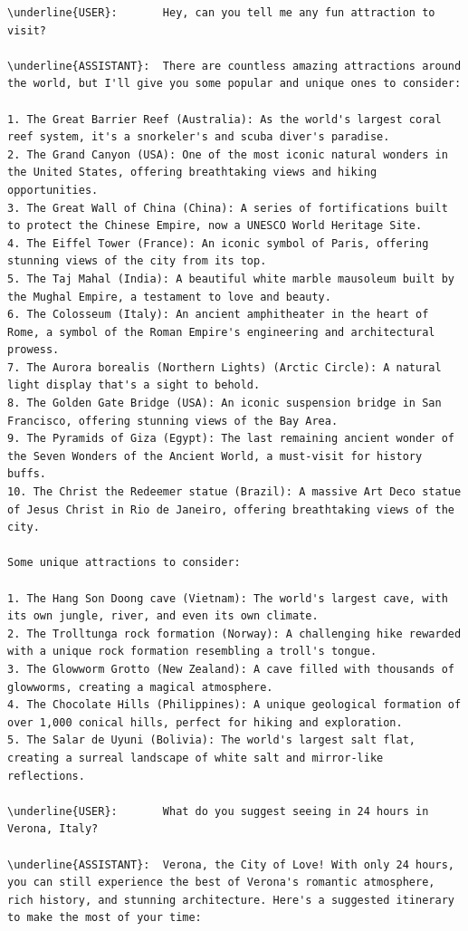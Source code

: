 \begin{Verbatim}[breaklines=true]
\underline{USER}:       Hey, can you tell me any fun attraction to visit?

\underline{ASSISTANT}:  There are countless amazing attractions around the world, but I'll give you some popular and unique ones to consider:

1. The Great Barrier Reef (Australia): As the world's largest coral reef system, it's a snorkeler's and scuba diver's paradise.
2. The Grand Canyon (USA): One of the most iconic natural wonders in the United States, offering breathtaking views and hiking opportunities.
3. The Great Wall of China (China): A series of fortifications built to protect the Chinese Empire, now a UNESCO World Heritage Site.
4. The Eiffel Tower (France): An iconic symbol of Paris, offering stunning views of the city from its top.
5. The Taj Mahal (India): A beautiful white marble mausoleum built by the Mughal Empire, a testament to love and beauty.
6. The Colosseum (Italy): An ancient amphitheater in the heart of Rome, a symbol of the Roman Empire's engineering and architectural prowess.
7. The Aurora borealis (Northern Lights) (Arctic Circle): A natural light display that's a sight to behold.
8. The Golden Gate Bridge (USA): An iconic suspension bridge in San Francisco, offering stunning views of the Bay Area.
9. The Pyramids of Giza (Egypt): The last remaining ancient wonder of the Seven Wonders of the Ancient World, a must-visit for history buffs.
10. The Christ the Redeemer statue (Brazil): A massive Art Deco statue of Jesus Christ in Rio de Janeiro, offering breathtaking views of the city.

Some unique attractions to consider:

1. The Hang Son Doong cave (Vietnam): The world's largest cave, with its own jungle, river, and even its own climate.
2. The Trolltunga rock formation (Norway): A challenging hike rewarded with a unique rock formation resembling a troll's tongue.
3. The Glowworm Grotto (New Zealand): A cave filled with thousands of glowworms, creating a magical atmosphere.
4. The Chocolate Hills (Philippines): A unique geological formation of over 1,000 conical hills, perfect for hiking and exploration.
5. The Salar de Uyuni (Bolivia): The world's largest salt flat, creating a surreal landscape of white salt and mirror-like reflections.

\underline{USER}:       What do you suggest seeing in 24 hours in Verona, Italy?

\underline{ASSISTANT}:  Verona, the City of Love! With only 24 hours, you can still experience the best of Verona's romantic atmosphere, rich history, and stunning architecture. Here's a suggested itinerary to make the most of your time:


\end{Verbatim}
